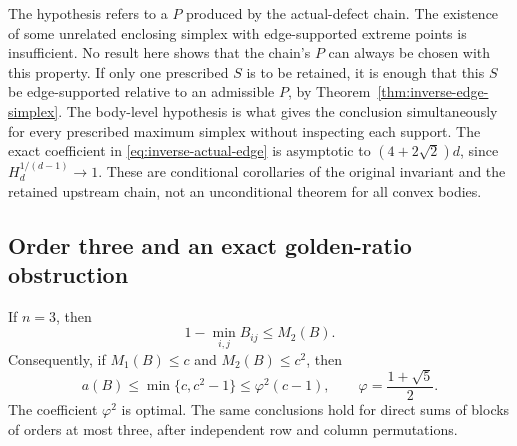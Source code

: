 \begin{remark}
\label{rem:inverse-compatible-P}
The hypothesis refers to a $P$ produced by the actual-defect chain.
The existence of some unrelated enclosing simplex with edge-supported
extreme points is insufficient.  No result here shows that the
chain's $P$ can always be chosen with this property.  If only one
prescribed $S$ is to be retained, it is enough that this $S$ be
edge-supported relative to an admissible $P$, by
Theorem~\ref{thm:inverse-edge-simplex}.  The body-level hypothesis is
what gives the conclusion simultaneously for every prescribed
maximum simplex without inspecting each support.  The exact
coefficient in \eqref{eq:inverse-actual-edge} is asymptotic to
$(4+2\sqrt2)d$, since $H_d^{1/(d-1)}\to1$.  These are conditional
corollaries of the original invariant and the retained upstream
chain, not an unconditional theorem for all convex bodies.
\end{remark}

\subsection{Order three and an exact golden-ratio obstruction}

\begin{theorem}
\label{thm:inverse-order-three}
If $n=3$, then
\begin{equation}
 1-\min_{i,j}B_{ij}\leq M_2(B).
 \label{eq:inverse-order-three}
\end{equation}
Consequently, if $M_1(B)\leq c$ and $M_2(B)\leq c^2$, then
\begin{equation}
 a(B)\leq\min\{c,c^2-1\}\leq\varphi^2(c-1),
 \qquad \varphi=\frac{1+\sqrt5}{2}.
 \label{eq:inverse-order-three-linear}
\end{equation}
The coefficient $\varphi^2$ is optimal.  The same conclusions hold
for direct sums of blocks of orders at most three, after independent
row and column permutations.
\end{theorem}

